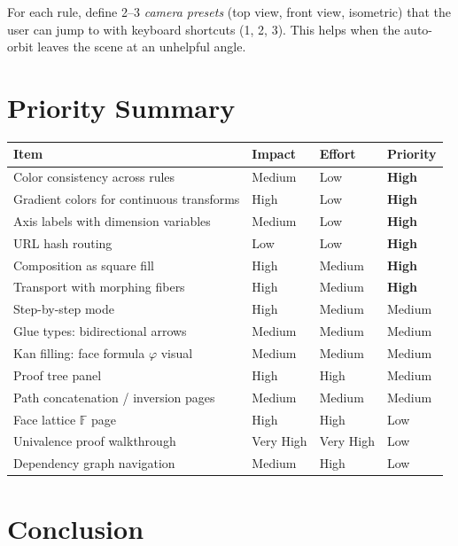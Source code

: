 \documentclass[11pt, a4paper]{article}
\begin{document}
For each rule, define 2--3 \emph{camera presets} (top view, front view, isometric)
that the user can jump to with keyboard shortcuts (1, 2, 3). This helps when the
auto-orbit leaves the scene at an unhelpful angle.

\section{Priority Summary}

\begin{center}
\begin{tabular}{llll}
\toprule
\textbf{Item} & \textbf{Impact} & \textbf{Effort} & \textbf{Priority} \\
\midrule
Color consistency across rules & Medium & Low & \textbf{High} \\
Gradient colors for continuous transforms & High & Low & \textbf{High} \\
Axis labels with dimension variables & Medium & Low & \textbf{High} \\
URL hash routing & Low & Low & \textbf{High} \\
Composition as square fill & High & Medium & \textbf{High} \\
Transport with morphing fibers & High & Medium & \textbf{High} \\
Step-by-step mode & High & Medium & Medium \\
Glue types: bidirectional arrows & Medium & Medium & Medium \\
Kan filling: face formula $\varphi$ visual & Medium & Medium & Medium \\
Proof tree panel & High & High & Medium \\
Path concatenation / inversion pages & Medium & Medium & Medium \\
Face lattice $\mathbb{F}$ page & High & High & Low \\
Univalence proof walkthrough & Very High & Very High & Low \\
Dependency graph navigation & Medium & High & Low \\
\bottomrule
\end{tabular}
\end{center}

\section{Conclusion}
\end{document}
